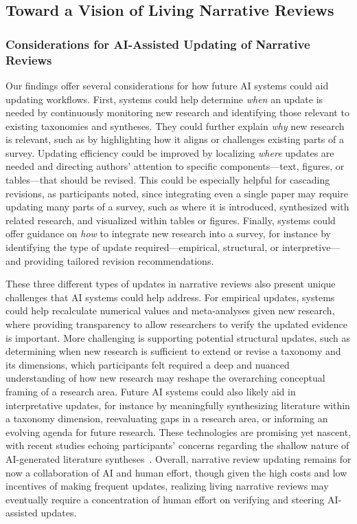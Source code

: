 \subsection{Toward a Vision of Living Narrative Reviews}

\subsubsection{Considerations for AI-Assisted Updating of Narrative Reviews}
Our findings offer several considerations for how future AI systems could aid updating workflows. First, systems could help determine \textit{when} an update is needed by continuously monitoring new research and identifying those relevant to existing taxonomies and syntheses. They could further explain \textit{why} new research is relevant, such as by highlighting how it aligns or challenges existing parts of a survey. Updating efficiency could be improved by localizing \textit{where} updates are needed and directing authors' attention to specific components---text, figures, or tables---that should be revised. This could be especially helpful for cascading revisions, as participants noted, since integrating even a single paper may require updating many parts of a survey, such as where it is introduced, synthesized with related research, and visualized within tables or figures. Finally, systems could offer guidance on \textit{how} to integrate new research into a survey, for instance by identifying the type of update required---empirical, structural, or interpretive---and providing tailored revision recommendations.

These three different types of updates in narrative reviews also present unique challenges that AI systems could help address. For empirical updates, systems could help recalculate numerical values and meta-analyses given new research, where providing transparency to allow researchers to verify the updated evidence is important. More challenging is supporting potential structural updates, such as determining when new research is sufficient to extend or revise a taxonomy and its dimensions, which participants felt required a deep and nuanced understanding of how new research may reshape the overarching conceptual framing of a research area. Future AI systems could also likely aid in interpretative updates, for instance by meaningfully synthesizing literature within a taxonomy dimension, reevaluating gaps in a research area, or informing an evolving agenda for future research. These technologies are promising yet nascent, with recent studies echoing participants' concerns regarding the shallow nature of AI-generated literature syntheses~\cite{martinboyle2024shallow}. Overall, narrative review updating remains for now a collaboration of AI and human effort, though given the high costs and low incentives of making frequent updates, realizing living narrative reviews may eventually require a concentration of human effort on verifying and steering AI-assisted updates.

